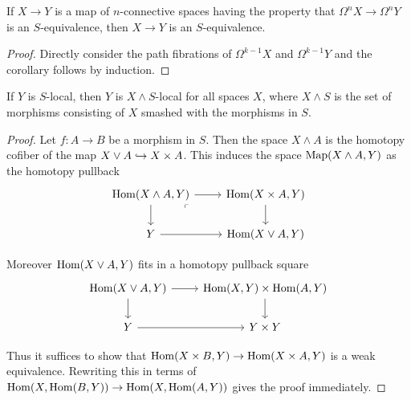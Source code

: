 	\begin{coro}\label{Quotient_lemma_coro_loopspace}
		If $X\to Y$ is a map of $n$-connective spaces having the property that $\Omega^nX\to\Omega^nY$ is an $S$-equivalence, then $X\to Y$ is an $S$-equivalence. 
	\end{coro}
	\begin{proof}
		Directly consider the path fibrations of $\Omega^{k-1}X$ and $\Omega^{k-1}Y$ and the corollary follows by induction. 
	\end{proof}

	\begin{lemma}\label{Smashing_lemma}
		If $Y$ is $S$-local, then $Y$ is $X\wedge S$-local for all spaces $X$, where $X\wedge S$ is the set of morphisms consisting of $X$ smashed with the morphisms in $S$. 
	\end{lemma}
	\begin{proof}
		Let $f:A\to B$ be a morphism in $S$. Then the space $X\wedge A$ is the homotopy cofiber of the map $X\vee A\hookrightarrow X\times A$. This induces the space $\operatorname{\mathrm{Map}}(X\wedge A,Y)$ as the homotopy pullback
		\[\begin{tikzcd}
			{\Hom(X\wedge A,Y)} & {\Hom(X\times A,Y)} \\
			Y & {\Hom(X\vee A,Y)}
			\arrow[from=1-1, to=1-2]
			\arrow[from=1-1, to=2-1]
			\arrow["\ulcorner"{anchor=center, pos=0.125}, draw=none, from=1-1, to=2-2]
			\arrow[from=1-2, to=2-2]
			\arrow[from=2-1, to=2-2]
		\end{tikzcd}\]

		Moreover $\operatorname{\mathrm{Hom}}(X\vee A,Y)$ fits in a homotopy pullback square 
		\[\begin{tikzcd}
			{\Hom(X\vee A,Y)} & {\Hom(X,Y)\times\Hom(A,Y)} \\
			Y & {Y\times Y}
			\arrow[from=1-1, to=1-2]
			\arrow[from=1-1, to=2-1]
			\arrow[from=1-2, to=2-2]
			\arrow[from=2-1, to=2-2]
		\end{tikzcd}\]

		Thus it suffices to show that $\operatorname{\mathrm{Hom}}(X\times B,Y)\to\operatorname{\mathrm{Hom}}(X\times A,Y)$ is a weak equivalence. Rewriting this in terms of $\operatorname{\mathrm{Hom}}(X,\operatorname{\mathrm{Hom}}(B,Y))\to\operatorname{\mathrm{Hom}}(X,\operatorname{\mathrm{Hom}}(A,Y))$ gives the proof immediately. 
	\end{proof}

